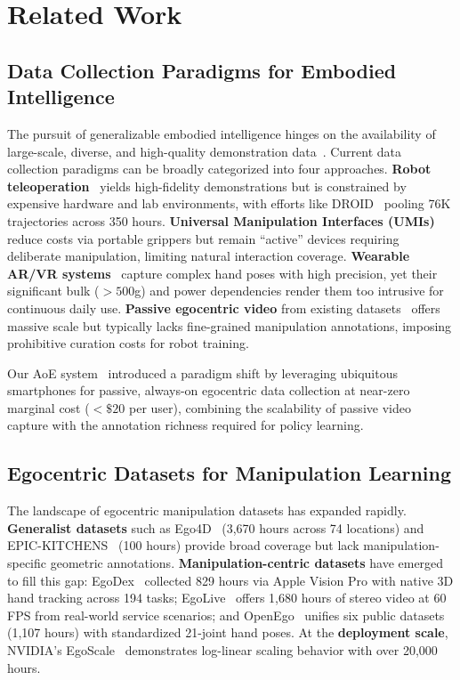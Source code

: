 \section{Related Work}

\subsection{Data Collection Paradigms for Embodied Intelligence}

The pursuit of generalizable embodied intelligence hinges on the availability of large-scale, diverse, and high-quality demonstration data~\cite{lindata,gen0}. Current data collection paradigms can be broadly categorized into four approaches. \textbf{Robot teleoperation}~\cite{chen2025towards} yields high-fidelity demonstrations but is constrained by expensive hardware and lab environments, with efforts like DROID~\cite{droid2024} pooling 76K trajectories across 350 hours. \textbf{Universal Manipulation Interfaces (UMIs)}~\cite{chi2024umi,xu2025dexumi} reduce costs via portable grippers but remain ``active'' devices requiring deliberate manipulation, limiting natural interaction coverage. \textbf{Wearable AR/VR systems}~\cite{wang2024dexcap,zhong2025humanoidexo,fang2024airexo} capture complex hand poses with high precision, yet their significant bulk ($>500$g) and power dependencies render them too intrusive for continuous daily use. \textbf{Passive egocentric video} from existing datasets~\cite{grauman2022ego4d,damen2018epic} offers massive scale but typically lacks fine-grained manipulation annotations, imposing prohibitive curation costs for robot training.

Our AoE system~\cite{aoe2026} introduced a paradigm shift by leveraging ubiquitous smartphones for passive, always-on egocentric data collection at near-zero marginal cost ($<\$20$ per user), combining the scalability of passive video capture with the annotation richness required for policy learning.

\subsection{Egocentric Datasets for Manipulation Learning}

The landscape of egocentric manipulation datasets has expanded rapidly. \textbf{Generalist datasets} such as Ego4D~\cite{grauman2022ego4d} (3,670 hours across 74 locations) and EPIC-KITCHENS~\cite{damen2018epic} (100 hours) provide broad coverage but lack manipulation-specific geometric annotations. \textbf{Manipulation-centric datasets} have emerged to fill this gap: EgoDex~\cite{egodex2025} collected 829 hours via Apple Vision Pro with native 3D hand tracking across 194 tasks; EgoLive~\cite{egolive2026} offers 1,680 hours of stereo video at 60 FPS from real-world service scenarios; and OpenEgo~\cite{openegocentric2025} unifies six public datasets (1,107 hours) with standardized 21-joint hand poses. At the \textbf{deployment scale}, NVIDIA's EgoScale~\cite{egoscale2026} demonstrates log-linear scaling behavior with over 20,000 hours.

